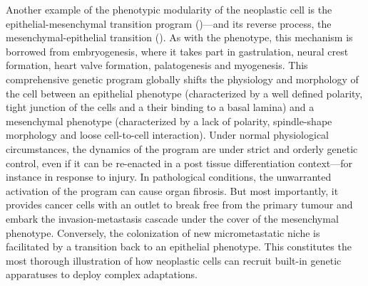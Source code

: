 
Another example of the phenotypic modularity of the neoplastic cell is the
epithelial-mesenchymal transition program ()---and its reverse
process, the mesenchymal-epithelial transition ().  As with the
 phenotype, this mechanism is borrowed from embryogenesis, where
it takes part in gastrulation, neural crest formation, heart valve formation,
palatogenesis and myogenesis.\cite{thiery_epithelial-mesenchymal_2009} This
comprehensive genetic program globally shifts the physiology and morphology of
the cell between an epithelial phenotype (characterized by a well defined
polarity, tight junction of the cells and a their binding to a basal lamina) and
a mesenchymal phenotype (characterized by a lack of polarity, spindle-shape
morphology and loose cell-to-cell interaction).\cite{thiery_complex_2006} Under
normal physiological circumstances, the dynamics of the 
program are under strict and orderly genetic control, even if it can be
re-enacted in a post tissue differentiation context---for instance in response
to injury.  In pathological conditions, the unwarranted activation of the
 program can cause organ fibrosis.  But most importantly, it
provides cancer cells with an outlet to break free from the primary tumour and
embark the invasion-metastasis cascade under the cover of the mesenchymal
phenotype.  Conversely, the colonization of new micrometastatic niche is
facilitated by a transition back to an epithelial phenotype.  This constitutes
the most thorough illustration of how neoplastic cells can recruit built-in
genetic apparatuses to deploy complex adaptations.

